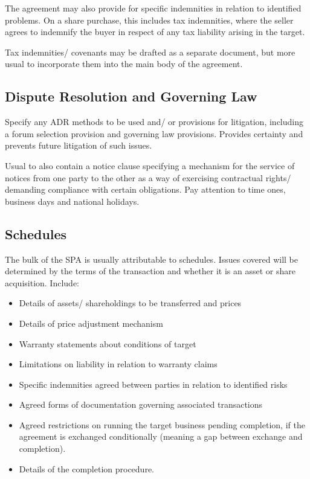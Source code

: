 \documentclass[
]{article}
\providecommand{\tightlist}{%
  \setlength{\itemsep}{0pt}\setlength{\parskip}{0pt}}
\begin{document}
The agreement may also provide for specific indemnities in relation to
identified problems. On a share purchase, this includes tax indemnities,
where the seller agrees to indemnify the buyer in respect of any tax
liability arising in the target.

Tax indemnities/ covenants may be drafted as a separate document, but
more usual to incorporate them into the main body of the agreement.

\hypertarget{dispute-resolution-and-governing-law}{%
\subsection{Dispute Resolution and Governing
Law}\label{dispute-resolution-and-governing-law}}

Specify any ADR methods to be used and/ or provisions for litigation,
including a forum selection provision and governing law provisions.
Provides certainty and prevents future litigation of such issues.

Usual to also contain a notice clause specifying a mechanism for the
service of notices from one party to the other as a way of exercising
contractual rights/ demanding compliance with certain obligations. Pay
attention to time ones, business days and national holidays.

\hypertarget{schedules}{%
\subsection{Schedules}\label{schedules}}

The bulk of the SPA is usually attributable to schedules. Issues covered
will be determined by the terms of the transaction and whether it is an
asset or share acquisition. Include:

\begin{itemize}
\tightlist
\item
  Details of assets/ shareholdings to be transferred and prices
\item
  Details of price adjustment mechanism
\item
  Warranty statements about conditions of target
\item
  Limitations on liability in relation to warranty claims
\item
  Specific indemnities agreed between parties in relation to identified
  risks
\item
  Agreed forms of documentation governing associated transactions
\item
  Agreed restrictions on running the target business pending completion,
  if the agreement is exchanged conditionally (meaning a gap between
  exchange and completion).
\item
  Details of the completion procedure.
\end{itemize}
\end{document}
